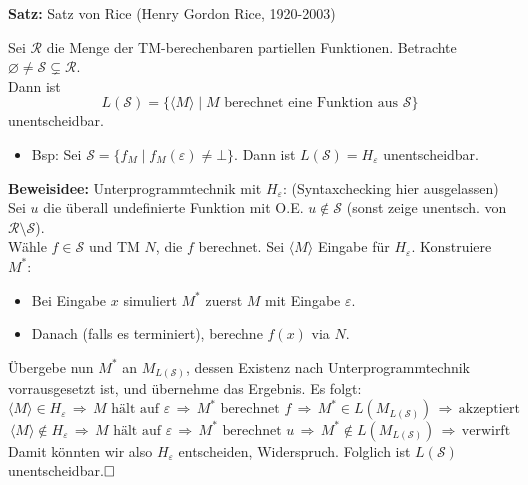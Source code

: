 \documentclass[a4paper,graphics,11pt]{article}
\newcommand{\eps}[0]{\varepsilon}
\newcommand{\godel}[1]{\langle #1 \rangle}
\begin{document}
\newpage

\textbf{Satz:} Satz von Rice (Henry Gordon Rice, 1920-2003)

Sei $\mathcal{R}$ die Menge der TM-berechenbaren partiellen Funktionen.
Betrachte $\varnothing \neq \mathcal{S} \subsetneq \mathcal{R}$.\\
Dann ist
$$
    L(\mathcal{S}) = \{\langle M \rangle \mid M \text{ berechnet eine Funktion aus } \mathcal{S}\}
$$
unentscheidbar.
\begin{itemize}
    \item Bsp: Sei $\mathcal{S} = \{f_M \mid f_M(\eps) \neq \bot\}$.
        Dann ist $L(\mathcal{S}) = H_\eps$ unentscheidbar.
\end{itemize}
\textbf{Beweisidee:} Unterprogrammtechnik mit $H_\eps$: (Syntaxchecking hier ausgelassen)\\
Sei $u$ die überall undefinierte Funktion mit O.E. $u \notin \mathcal{S}$
(sonst zeige unentsch. von $\mathcal{R} \setminus \mathcal{S}$).\\
Wähle $f \in \mathcal{S}$ und TM $N$, die $f$ berechnet.
Sei $\godel{M}$ Eingabe für $H_\eps$. Konstruiere $M^*$:
\begin{itemize}
    \item Bei Eingabe $x$ simuliert $M^*$ zuerst $M$ mit Eingabe $\eps$.
    \item Danach (falls es terminiert), berechne $f(x)$ via $N$.
\end{itemize}
Übergebe nun $M^*$ an $M_{L(\mathcal{S})}$, dessen Existenz nach Unterprogrammtechnik vorrausgesetzt ist,
und übernehme das Ergebnis.
Es folgt:
$$
    \godel{M} \in H_\eps
    \,\Longrightarrow\, \text{$M$ hält auf $\eps$}
    \,\Longrightarrow\, \text{$M^*$ berechnet $f$}
    \,\Longrightarrow\, M^* \in L(M_{L(\mathcal{S})})
    \,\Longrightarrow\, \text{akzeptiert}
$$
$$
    \godel{M} \notin H_\eps
    \,\Longrightarrow\, \text{$M$ hält auf $\eps$}
    \,\Longrightarrow\, \text{$M^*$ berechnet $u$}
    \,\Longrightarrow\, M^* \notin L(M_{L(\mathcal{S})})
    \,\Longrightarrow\, \text{verwirft}
$$
Damit könnten wir also $H_\eps$ entscheiden, Widerspruch. Folglich ist $L(\mathcal{S})$ unentscheidbar.$\hfill\square$
\\
\end{document}
